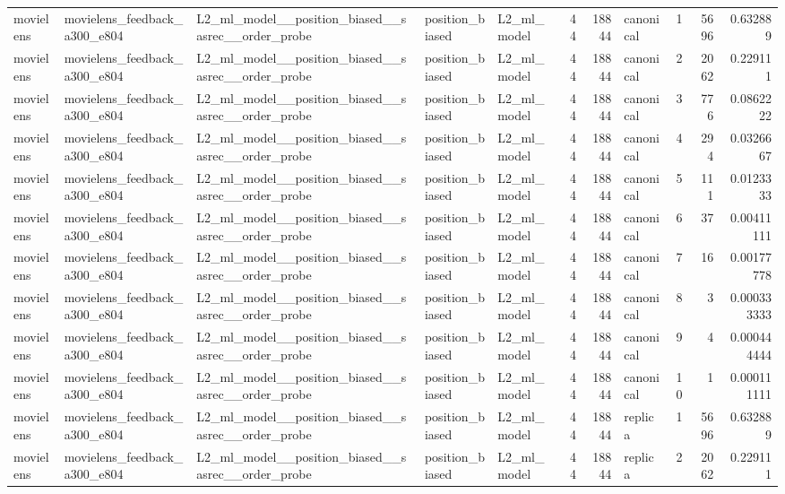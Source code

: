\begin{table}[htbp!]
\begin{tabular}{lllllrrlrrr}
movielens & movielens\_feedback\_a300\_e804 & L2\_ml\_model\_\_position\_biased\_\_sasrec\_\_order\_probe & position\_biased & L2\_ml\_model & 44 & 18844 & canonical & 1 & 5696 & 0.632889 \\
movielens & movielens\_feedback\_a300\_e804 & L2\_ml\_model\_\_position\_biased\_\_sasrec\_\_order\_probe & position\_biased & L2\_ml\_model & 44 & 18844 & canonical & 2 & 2062 & 0.229111 \\
movielens & movielens\_feedback\_a300\_e804 & L2\_ml\_model\_\_position\_biased\_\_sasrec\_\_order\_probe & position\_biased & L2\_ml\_model & 44 & 18844 & canonical & 3 & 776 & 0.0862222 \\
movielens & movielens\_feedback\_a300\_e804 & L2\_ml\_model\_\_position\_biased\_\_sasrec\_\_order\_probe & position\_biased & L2\_ml\_model & 44 & 18844 & canonical & 4 & 294 & 0.0326667 \\
movielens & movielens\_feedback\_a300\_e804 & L2\_ml\_model\_\_position\_biased\_\_sasrec\_\_order\_probe & position\_biased & L2\_ml\_model & 44 & 18844 & canonical & 5 & 111 & 0.0123333 \\
movielens & movielens\_feedback\_a300\_e804 & L2\_ml\_model\_\_position\_biased\_\_sasrec\_\_order\_probe & position\_biased & L2\_ml\_model & 44 & 18844 & canonical & 6 & 37 & 0.00411111 \\
movielens & movielens\_feedback\_a300\_e804 & L2\_ml\_model\_\_position\_biased\_\_sasrec\_\_order\_probe & position\_biased & L2\_ml\_model & 44 & 18844 & canonical & 7 & 16 & 0.00177778 \\
movielens & movielens\_feedback\_a300\_e804 & L2\_ml\_model\_\_position\_biased\_\_sasrec\_\_order\_probe & position\_biased & L2\_ml\_model & 44 & 18844 & canonical & 8 & 3 & 0.000333333 \\
movielens & movielens\_feedback\_a300\_e804 & L2\_ml\_model\_\_position\_biased\_\_sasrec\_\_order\_probe & position\_biased & L2\_ml\_model & 44 & 18844 & canonical & 9 & 4 & 0.000444444 \\
movielens & movielens\_feedback\_a300\_e804 & L2\_ml\_model\_\_position\_biased\_\_sasrec\_\_order\_probe & position\_biased & L2\_ml\_model & 44 & 18844 & canonical & 10 & 1 & 0.000111111 \\
movielens & movielens\_feedback\_a300\_e804 & L2\_ml\_model\_\_position\_biased\_\_sasrec\_\_order\_probe & position\_biased & L2\_ml\_model & 44 & 18844 & replica & 1 & 5696 & 0.632889 \\
movielens & movielens\_feedback\_a300\_e804 & L2\_ml\_model\_\_position\_biased\_\_sasrec\_\_order\_probe & position\_biased & L2\_ml\_model & 44 & 18844 & replica & 2 & 2062 & 0.229111 \\

\end{tabular}
\end{table}
